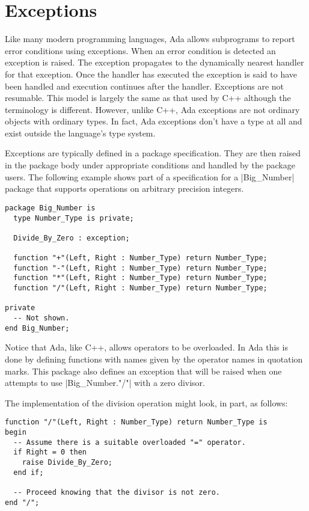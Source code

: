 \section{Exceptions}

Like many modern programming languages, Ada allows subprograms to report error conditions using
exceptions. When an error condition is detected an exception is raised. The exception propagates
to the dynamically nearest handler for that exception. Once the handler has executed the
exception is said to have been handled and execution continues after the handler. Exceptions are
not resumable. This model is largely the same as that used by C++ although the terminology is
different. However, unlike C++, Ada exceptions are not ordinary objects with ordinary types. In
fact, Ada exceptions don't have a type at all and exist outside the language's type system.

Exceptions are typically defined in a package specification. They are then raised in the package
body under appropriate conditions and handled by the package users. The following example shows
part of a specification for a |Big_Number| package that supports operations on arbitrary
precision integers.

\begin{lstlisting}
package Big_Number is
  type Number_Type is private;

  Divide_By_Zero : exception;

  function "+"(Left, Right : Number_Type) return Number_Type;
  function "-"(Left, Right : Number_Type) return Number_Type;
  function "*"(Left, Right : Number_Type) return Number_Type;
  function "/"(Left, Right : Number_Type) return Number_Type;

private
  -- Not shown.
end Big_Number;
\end{lstlisting}

Notice that Ada, like C++, allows operators to be overloaded. In Ada this is done by defining
functions with names given by the operator names in quotation marks. This package also defines
an exception that will be raised when one attempts to use |Big_Number."/"| with a zero divisor.

The implementation of the division operation might look, in part, as follows:

\begin{lstlisting}
function "/"(Left, Right : Number_Type) return Number_Type is
begin
  -- Assume there is a suitable overloaded "=" operator.
  if Right = 0 then
    raise Divide_By_Zero;
  end if;

  -- Proceed knowing that the divisor is not zero.
end "/";
\end{lstlisting}

